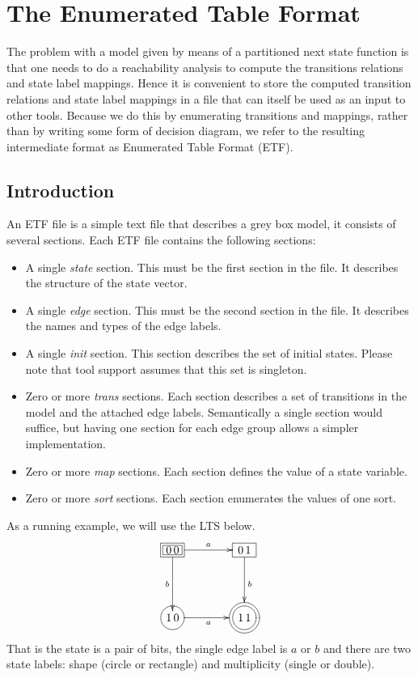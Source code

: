 \chapter{The Enumerated Table Format}


The problem with a model given by means of a partitioned
next state function is that one needs to do a reachability analysis to
compute the transitions relations and state label mappings.
Hence it is convenient to store the computed transition relations
and state label mappings in a file that can itself be
used as an input to other tools. Because we do this by enumerating
transitions and mappings, rather than by writing  some
form of decision diagram, we refer to the resulting intermediate
format as Enumerated Table Format (ETF).

\section{Introduction}

An ETF file is a simple text file that describes a grey box model,
it consists of several sections. Each ETF file contains the following sections:
\begin{itemize}
\item A single {\em state} section. This must be the first section in the file.
It describes the structure of the state vector.
\item A single {\em edge} section. This must be the second section in the file.
It describes the names and types of the edge labels.
\item A single {\em init} section. This section describes the set of initial states.
Please note that tool support assumes that this set is singleton.
\item Zero or more {\em trans} sections. Each section describes a set of transitions
in the model and the attached edge labels. Semantically a single section would suffice,
but having one section for each edge group allows a simpler implementation.
\item Zero or more {\em map} sections. Each section defines the value of a state variable.
\item Zero or more {\em sort} sections. Each section enumerates the values of one sort.
\end{itemize}

As a running example, we will use the LTS below.
\[
{\xymatrix@=4em{
*+[F=]{\,0\,0\,} \ar@{->}[r]^a\ar@{->}[d]_b
&
*+[F]{\,0\,1\,} \ar@{->}[d]^b
\\
*+[Fo]{\,1\,0\,} \ar@{->}[r]_a
&
*+[Fo]+=+[Fo]{\,1\,1\,}
}}
\]
That is the state is a pair of bits, the single edge label is $a$ or $b$ and there are
two state labels: shape (circle or rectangle) and multiplicity (single or double).

